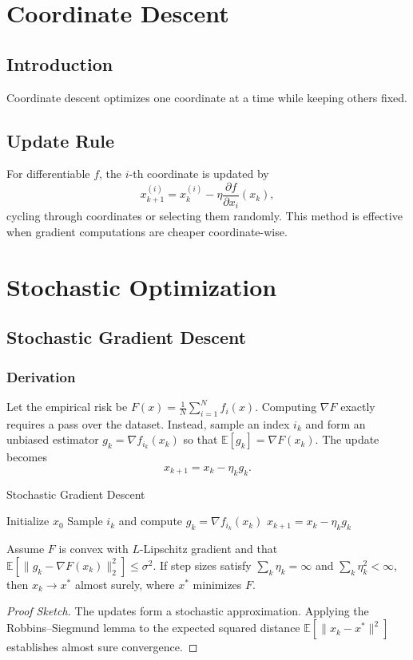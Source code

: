 \section{Coordinate Descent}
\subsection{Introduction}
Coordinate descent optimizes one coordinate at a time while keeping others fixed.
\subsection{Update Rule}
For differentiable $f$, the $i$-th coordinate is updated by
\begin{equation}
x_{k+1}^{(i)} = x_k^{(i)} - \eta \frac{\partial f}{\partial x_i}(x_k),
\end{equation}
cycling through coordinates or selecting them randomly. This method is effective when gradient computations are cheaper coordinate-wise.

\section{Stochastic Optimization}
\subsection{Stochastic Gradient Descent}
\subsubsection{Derivation}
Let the empirical risk be $F(x)=\frac{1}{N}\sum_{i=1}^N f_i(x)$. Computing $\nabla F$ exactly requires a pass over the dataset. Instead, sample an index $i_k$ and form an unbiased estimator $g_k=\nabla f_{i_k}(x_k)$ so that $\mathbb{E}[g_k]=\nabla F(x_k)$. The update becomes
\begin{equation}
x_{k+1}=x_k-\eta_k g_k.
\end{equation}

\begin{algorithm}
\caption{Stochastic Gradient Descent}
\begin{algorithmic}[1]
\STATE Initialize $x_0$
    \STATE Sample $i_k$ and compute $g_k = \nabla f_{i_k}(x_k)$
    \STATE $x_{k+1}=x_k-\eta_k g_k$
\ENDFOR
\end{algorithmic}
\end{algorithm}

\begin{theorem}
Assume $F$ is convex with $L$-Lipschitz gradient and that $\mathbb{E}[\|g_k-\nabla F(x_k)\|_2^2]\le\sigma^2$. If step sizes satisfy $\sum_k \eta_k=\infty$ and $\sum_k \eta_k^2<\infty$, then $x_k\to x^*$ almost surely, where $x^*$ minimizes $F$.
\end{theorem}
\begin{proof}[Proof Sketch]
The updates form a stochastic approximation. Applying the Robbins--Siegmund lemma to the expected squared distance $\mathbb{E}[\|x_k-x^*\|^2]$ establishes almost sure convergence.
\end{proof}

